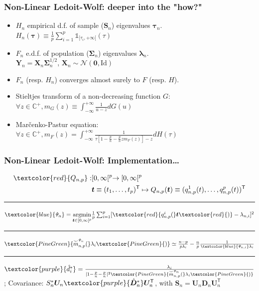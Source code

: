 \documentclass[xcolor=dvipsnames]{beamer}
\def\B#1{\bm{#1}}
\def\trans{^\mathsf{T}}
\begin{document}
\begin{frame}
  \frametitle{Non-Linear Ledoit-Wolf: deeper into the "how?"}

  \begin{itemize}
  \item $H_n$ empirical d.f. of sample ($\B{S}_n$) eigenvalues $\B{\tau}_n$.\\
    $H_n(\B{\tau}) \equiv
    \frac{1}{p}\sum^p_{i=1}\mathbb{1}_{[\tau_i,+\infty[}(\tau)$
  \item $F_n$ e.d.f. of population ($\B{\Sigma}_n$) eigenvalues
    $\B{\lambda}_n$.\\$\B{Y}_n = \B{X}_n\B{\Sigma}^{1/2}_n$, $\B{X}_n
    \sim \mathcal{N}(\B{0},\text{Id})$
  \item $F_n$ (resp. $H_n$) converges almost surely to $F$ (resp. $H$).
  \item Stieltjes transform of a non-decreasing function $G$:
     $\forall z \in \mathbb{C}^+, m_G(z) \equiv
     \int^{+\infty}_{-\infty}\frac{1}{u - z}dG(u)$
   \item Mar\v{c}enko-Pastur equation: $\forall z \in \mathbb{C}^+,
     m_F(z) = \int^{+\infty}_{-\infty}\frac{1}{\tau[1-\frac{p}{n}-\frac{p}{n}zm_F(z)] - z}dH(\tau)$
  \end{itemize}
\end{frame}

\begin{frame}
  \frametitle{Non-Linear Ledoit-Wolf: Implementation\ldots}

  \begin{equation*}
    \begin{split}
      \textcolor{red}{Q_{n,p}}: & [0, \infty[^p \rightarrow [0,\infty[^p \\
              & \B{t} \equiv (t_1,\ldots,t_p)\trans
              \mapsto Q_{n,p}(\B{t}) \equiv
              (q^1_{n,p}(t),\ldots,q^p_{n,p}(t))\trans
    \end{split}
  \end{equation*}

  \vfill
  \hrule{}
  \vfill

  $\textcolor{blue}{\hat{\B{\tau}}_n} = \underset{\B{t} \in [0, \infty[^p}{\text{argmin}} 
      \frac{1}{p} \sum^p_{i=1}[\textcolor{red}{q^i_{n,p}(}\B{t}\textcolor{red}{)} - \lambda_{n,i}]^2$

  \vfill
  \hrule{}
  \vfill

  $\textcolor{PineGreen}{\overset{\smile}{m}^{\hat{\B{\tau}}_n}_{n,p}(}\lambda_i\textcolor{PineGreen}{)} \simeq \frac{n-p}{p\lambda_i} - \frac{n}{p}\frac{1}{\textcolor{blue}{\hat{\B{\tau}}_{n,i}}\lambda_i}$

  \vfill
  \hrule{}
  \vfill

  $\textcolor{purple}{\hat{d}_i^*} = \frac{\lambda_i}{|1 - \frac{p}{n} - \frac{p}{n}|^2\textcolor{PineGreen}{\overset{\smile}{m}^{\hat{\B{\tau}}_n}_{n,p}(}\lambda_i\textcolor{PineGreen}{)}}$; {\scriptsize Covariance:} $S_n^*\B{U}_n\textcolor{purple}{\hat{\B{D}}^*_n}\B{U}_n\trans${\scriptsize , with }$\B{S}_n=\B{U}_n\B{D}_n\B{U}_n\trans$
  
\end{frame}
\end{document}
